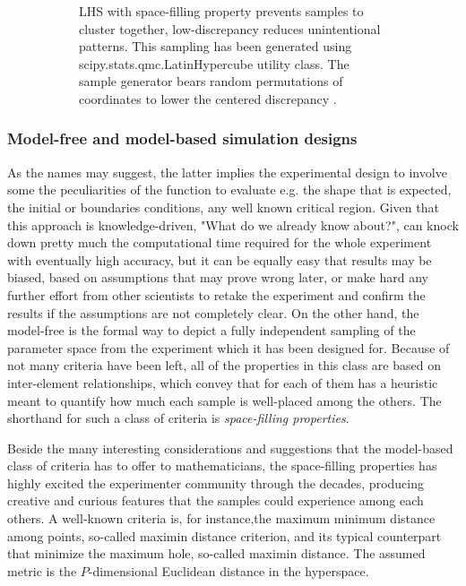 \documentclass[12pt]{extarticle}
\newcommand{\midcaption}[1]{
    \captionsetup{justification=centering}
    \caption{#1}
}
\begin{document}
\begin{figure}[h]
\begin{subfigure}[b]{0.45\textwidth}
{        	\caption{LHS with space-filling property prevents samples to cluster together, low-discrepancy reduces unintentional patterns. This sampling has been generated using scipy.stats.qmc.LatinHypercube utility class. The sample generator bears random permutations of coordinates to lower the centered discrepancy .}
        	\label{fig:good_design}
        }
    \end{subfigure}
    
	\midcaption{}
    \label{fig:latin_square}
\end{figure}

\subsubsection{Model-free and model-based simulation designs}
\label{subsubsec:model_free_model_based}
As the names may suggest, the latter implies the experimental design to involve some the peculiarities of the function to evaluate e.g. the shape that is expected, the initial or boundaries conditions, any well known critical region. Given that this approach is knowledge-driven, "What do we already know about?", can knock down pretty much the computational time required for the whole experiment with eventually high accuracy, but it can be equally easy that results may be biased, based on assumptions that may prove wrong later, or make hard any further effort from other scientists to retake the experiment and confirm the results if the assumptions are not completely clear.
On the other hand, the model-free is the formal way to depict a fully independent sampling of the parameter space from the experiment which it has been designed for. Because of not many criteria have been left, all of the properties in this class are based on inter-element relationships, which convey that for each of them has a heuristic meant to quantify how much each sample is well-placed among the others. The shorthand for such a class of criteria is \textit{space-filling properties}.

Beside the many interesting considerations and suggestions that the model-based class of criteria has to offer to mathematicians, the space-filling properties has highly excited the experimenter community through the decades, producing creative and curious features that the samples could experience among each others. A well-known criteria is, for instance,the maximum minimum distance among points, so-called maximin distance criterion, and its typical counterpart that minimize the maximum hole, so-called maximin distance. The assumed metric is the $P$-dimensional Euclidean distance in the hyperspace.
\end{document}
